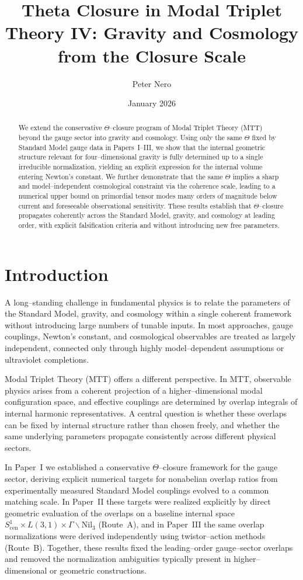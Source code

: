 \documentclass[11pt]{article}
\title{Theta Closure in Modal Triplet Theory IV:
Gravity and Cosmology from the Closure Scale}
\author{Peter Nero}
\date{January 2026}
\begin{document}
\maketitle

\begin{abstract}
We extend the conservative $\Theta$--closure program of Modal Triplet Theory
(MTT) beyond the gauge sector into gravity and cosmology.
Using only the same $\Theta$ fixed by Standard Model gauge data in
Papers~I--III, we show that the internal geometric structure relevant for
four--dimensional gravity is fully determined up to a single irreducible
normalization, yielding an explicit expression for the internal volume entering
Newton's constant.
We further demonstrate that the same $\Theta$ implies a sharp and model--independent
cosmological constraint via the coherence scale, leading to a numerical upper
bound on primordial tensor modes many orders of magnitude below current and
foreseeable observational sensitivity.
These results establish that $\Theta$--closure propagates coherently across the
Standard Model, gravity, and cosmology at leading order, with explicit
falsification criteria and without introducing new free parameters.
\end{abstract}


\section{Introduction}

A long--standing challenge in fundamental physics is to relate the parameters of
the Standard Model, gravity, and cosmology within a single coherent framework
without introducing large numbers of tunable inputs.
In most approaches, gauge couplings, Newton's constant, and cosmological
observables are treated as largely independent, connected only through
highly model--dependent assumptions or ultraviolet completions.

Modal Triplet Theory (MTT) offers a different perspective.
In MTT, observable physics arises from a coherent projection of a higher--dimensional
modal configuration space, and effective couplings are determined by overlap
integrals of internal harmonic representatives.
A central question is whether these overlaps can be fixed by internal structure
rather than chosen freely, and whether the same underlying parameters propagate
consistently across different physical sectors.

In Paper~I we established a conservative $\Theta$--closure framework for the
gauge sector, deriving explicit numerical targets for nonabelian overlap ratios
from experimentally measured Standard Model couplings evolved to a common
matching scale.
In Paper~II these targets were realized explicitly by direct geometric
evaluation of the overlaps on a baseline internal space
$S^1_{\mathrm{cen}}\times L(3,1)\times\Gamma\backslash\mathrm{Nil}_3$ (Route~A),
and in Paper~III the same overlap normalizations were derived independently
using twistor--action methods (Route~B).
Together, these results fixed the leading--order gauge--sector overlaps and
removed the normalization ambiguities typically present in higher--dimensional
or geometric constructions.
\end{document}
